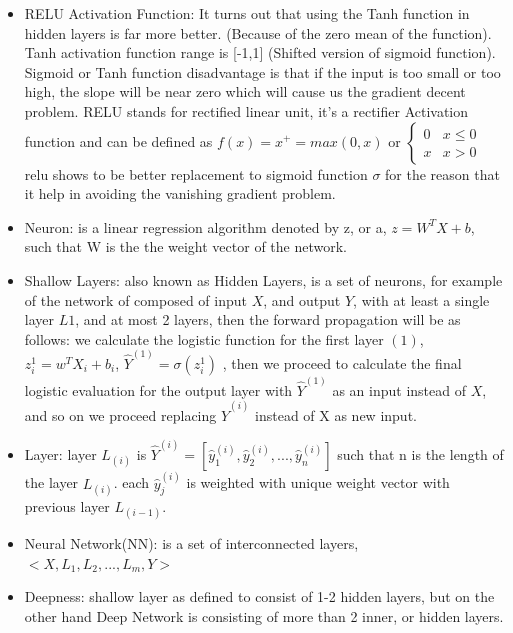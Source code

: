 \documentclass[4apaper,12pt]{book}
\begin{document}
\begin{itemize}
\item RELU Activation Function: It turns out that using the Tanh function in hidden layers is far more better. (Because of the zero mean of the function). Tanh activation function range is [-1,1] (Shifted version of sigmoid function). Sigmoid or Tanh function disadvantage is that if the input is too small or too high, the slope will be near zero which will cause us the gradient decent problem. RELU stands for rectified linear unit, it's a rectifier Activation function and can be defined as $f(x)=x^+=max(0,x)$ or $\begin{cases} 0 & x\leq 0 \\ x & x > 0 \end{cases}$ relu shows to be better replacement to sigmoid function $\sigma$ for the reason that it help in avoiding the vanishing gradient problem.
\item Neuron: is a linear regression algorithm denoted by z, or a, $z= W^TX + b$, such that W is the the weight vector of the network.
\item Shallow Layers: also known as Hidden Layers, is a set of neurons, for example of the network of composed of input $X$, and output $Y$, with at least a single layer $L1$, and at most 2 layers, then the forward propagation will be as follows: we calculate the logistic function for the first layer $(1)$,  $z^{1}_i=w^TX_i+b_i$, $\hat{Y}^{(1)}=\sigma{(z^{1}_i)}$ , then we proceed to calculate the final logistic evaluation for the output layer with $\hat{Y}^{(1)}$ as an input instead of $X$, and so on we proceed replacing $\hat{Y}^{(i)}$ instead of X as new input.
\item Layer: layer $L_{(i)}$ is $\hat{Y}^{(i)}=[\hat{y}^{(i)}_1, \hat{y}^{(i)}_2, ..., \hat{y}^{(i)}_n]$ such that n is the length of the layer $L_{(i)}$. each $\hat{y}^{(i)}_{j}$ is weighted with unique weight vector with previous layer $L_{(i-1)}$.

\item Neural Network(NN): is a set of interconnected layers, $<X, L_1, L_2, ..., L_m, Y>$

\item Deepness: shallow layer as defined to consist of 1-2 hidden layers, but on the other hand Deep Network is consisting of more than 2 inner, or hidden layers.

\end{itemize}
\end{document}

